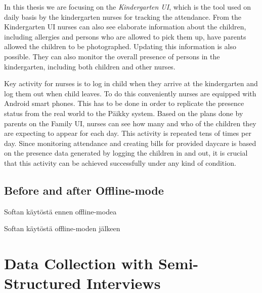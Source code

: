 \noindent In this thesis we are focusing on the \textit{Kindergarten UI}, which is the tool used on daily basis by the kindergarten nurses for tracking the attendance. From the Kindergarten UI nurses can also see elaborate information about the children, including allergies and persons who are allowed to pick them up, have parents allowed the children to be photographed. Updating this information is also possible. They can also monitor the overall presence of persons in the kindergarten, including both children and other nurses.

Key activity for nurses is to log in child when they arrive at the kindergarten and log them out when child leaves. To do this conveniently nurses are equipped with Android smart phones. This has to be done in order to replicate the presence status from the real world to the Päikky system. Based on the plans done by parents on the Family UI, nurses can see how many and who of the children they are expecting to appear for each day. This activity is repeated tens of times per day. Since monitoring attendance and creating bills for provided daycare is based on the presence data generated by logging the children in and out, it is crucial that this activity can be achieved successfully under any kind of condition.





\subsection{Before and after Offline-mode}
Softan käytöstä ennen offline-modea

Softan käytöstä offline-moden jälkeen







\section{Data Collection with Semi-Structured Interviews}

